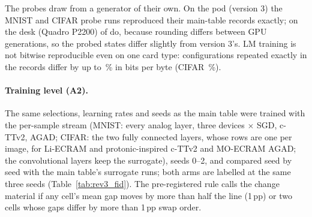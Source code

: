 The probes draw from a generator of their own. On the pod (version 3) the MNIST and CIFAR probe runs reproduced their main-table
records exactly; on the desk (Quadro P2200) \RYProbeRunsEqualEThree{} of \RYProbeRunsN{} do, because rounding differs between GPU
generations, so the probed states differ slightly from version 3's. LM training is not bitwise reproducible even on one card
type: configurations repeated exactly in the records differ by up to \RXReproLmMaxPct\,\% in bits per byte (CIFAR
\RXReproCifarMaxPct\,\%).

\paragraph{Training level (A2).} The same selections, learning rates and seeds as the main table were trained with the
per-sample stream (MNIST: every analog layer, three devices $\times$ SGD, c-TTv2, AGAD; CIFAR: the two fully connected layers,
whose rows are one per image, for Li-ECRAM and protonic-inspired c-TTv2 and MO-ECRAM AGAD; the convolutional layers keep the
surrogate), seeds 0--2, and compared seed by seed with the main table's surrogate runs; both arms are labelled at the same three
seeds (Table~\ref{tab:rev3_fid}). The pre-registered rule calls the change material if any cell's mean gap moves by more than
half the line (1\,pp) or two cells whose gaps differ by more than 1\,pp swap order.
